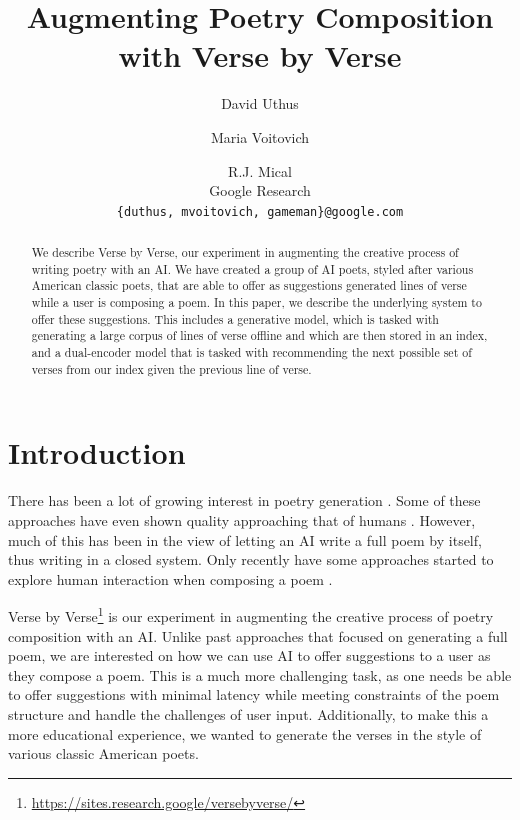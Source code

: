 \documentclass[11pt]{article}
\title{Augmenting Poetry Composition with Verse by Verse}
\author{
 David Uthus \and Maria Voitovich \and R.J. Mical \\
 Google Research \\
  {\texttt{\{duthus, mvoitovich, gameman\}@google.com}} \\
}
\begin{document}
\maketitle
\begin{abstract}
We describe Verse by Verse, our experiment in augmenting the creative process of writing poetry with an AI.
We have created a group of AI poets, styled after various American classic poets, that are able to offer as suggestions generated lines of verse while a user is composing a poem.
In this paper, we describe the underlying system to offer these suggestions.
This includes a generative model, which is tasked with generating a large corpus of lines of verse offline and which are then stored in an index, and a dual-encoder model that is tasked with recommending the next possible set of verses from our index given the previous line of verse.
\end{abstract}



\section{Introduction}

There has been a lot of growing interest in poetry generation \cite{oliveira2017}.
Some of these approaches have even shown quality approaching that of humans \cite{lau2018}.
However, much of this has been in the view of letting an AI write a full poem by itself, thus writing in a closed system.
Only recently have some approaches started to explore human interaction when composing a poem \cite{ghazvininejad2016, ghazvininejad2017, oliveira17b, zhipeng2019}.


Verse by Verse\footnote{\url{https://sites.research.google/versebyverse/}} is our experiment in augmenting the creative process of poetry composition with an AI.
Unlike past approaches that focused on generating a full poem, we are interested on how we can use AI to offer suggestions to a user as they compose a poem.
This is a much more challenging task, as one needs be able to offer suggestions with minimal latency while meeting constraints of the poem structure and handle the challenges of user input.
Additionally, to make this a more educational experience, we wanted to generate the verses in the style of various classic American poets.
\end{document}

